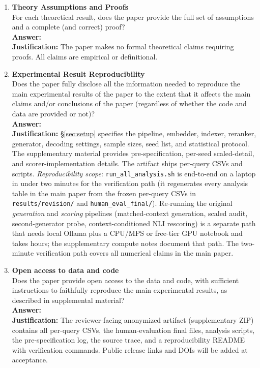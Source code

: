 \begin{enumerate}
\item {\bf Theory Assumptions and Proofs}\\
For each theoretical result, does the paper provide the full set of
assumptions and a complete (and correct) proof?
\\\textbf{Answer: \answerNA{}}
\\\textbf{Justification:} The paper makes no formal theoretical
claims requiring proofs. All claims are empirical or definitional.

\item {\bf Experimental Result Reproducibility}\\
Does the paper fully disclose all the information needed to reproduce
the main experimental results of the paper to the extent that it
affects the main claims and/or conclusions of the paper (regardless of
whether the code and data are provided or not)?
\\\textbf{Answer: \answerYes{}}
\\\textbf{Justification:} \S\ref{sec:setup} specifies the pipeline,
embedder, indexer, reranker, generator, decoding settings, sample
sizes, seed list, and statistical protocol. The supplementary material
provides pre-specification, per-seed scaled-detail, and scorer-implementation
details. The artifact
ships per-query CSVs and scripts. \emph{Reproducibility scope}:
\texttt{run\_all\_analysis.sh} is end-to-end on a laptop in under
two minutes for the verification path (it regenerates every
analysis table in the main paper from the frozen per-query CSVs in
\texttt{results/revision/} and \texttt{human\_eval\_final/}).
Re-running the original \emph{generation} and \emph{scoring}
pipelines (matched-context generation, scaled audit, second-generator
probe, context-conditioned NLI rescoring) is a separate path that
needs local Ollama plus a CPU/MPS or free-tier GPU notebook and
takes hours; the supplementary compute notes document that path. The two-minute
verification path covers all numerical claims in the main paper.

\item {\bf Open access to data and code}\\
Does the paper provide open access to the data and code, with
sufficient instructions to faithfully reproduce the main experimental
results, as described in supplemental material?
\\\textbf{Answer: \answerYes{}}
\\\textbf{Justification:} The reviewer-facing anonymized artifact
(supplementary ZIP) contains all per-query CSVs, the human-evaluation
final files, analysis scripts, the pre-specification log, the source
trace, and a reproducibility README with verification commands.
Public release links and DOIs will be added at acceptance.


\end{enumerate}
